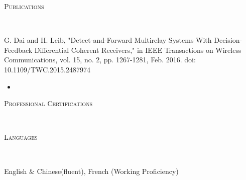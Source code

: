 \documentclass[11pt]{article}
\newenvironment{changemargin}[2]{%
  \begin{list}{}{%
    \setlength{\topsep}{0pt}%
    \setlength{\leftmargin}{#1}%
    \setlength{\rightmargin}{#2}%
    \setlength{\listparindent}{\parindent}%
    \setlength{\itemindent}{\parindent}%
    \setlength{\parsep}{\parskip}%
  }%
  \item[]}{\end{list}
}
\newcommand{\lineover}{
	\begin{changemargin}{-0.05in}{-0.05in}
		\vspace*{-8pt}
		\hrulefill \\
		\vspace*{-2pt}
	\end{changemargin}
}
\newcommand{\header}[1]{
	\begin{changemargin}{-0.5in}{-0.5in}
		\scshape{#1}\\
  	\lineover
	\end{changemargin}
}
\newenvironment{body} {
	\vspace*{-16pt}
	\begin{changemargin}{-0.25in}{-0.5in}
  }	
	{\end{changemargin}
}
\begin{document}
\smallskip

\header{Publications}
\begin{body}
	\vspace{14pt}
	G. Dai and H. Leib, "Detect-and-Forward Multirelay Systems With Decision-Feedback Differential Coherent Receivers," in IEEE Transactions on Wireless Communications, vol. 15, no. 2, pp. 1267-1281, Feb. 2016.
doi: 10.1109/TWC.2015.2487974
\end{body}
\smallskip
	\begin{itemize} \itemsep
		\item 
	\end{itemize}
\header{Professional Certifications}
\begin{body}
	\vspace{14pt}
	
\end{body}
\smallskip

\header{Languages}
\begin{body}
	\vspace{14pt}
	English \& Chinese(fluent), French (Working Proficiency)\\
\end{body}
\smallskip
\end{document}

